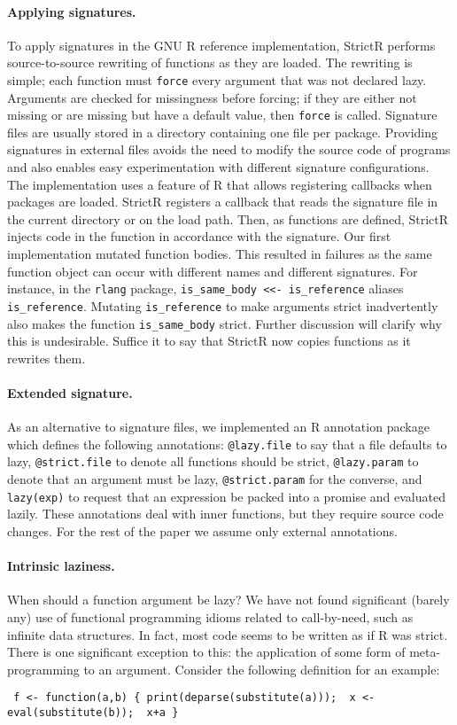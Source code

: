 \documentclass[review,creen,acmsmall]{acmart}
\newcommand{\code}[1]{\lstinline |#1|\xspace}
\renewcommand{\c}[1]{\lstinline |#1|\xspace}
\newcommand{\strictr}{{\sf StrictR}\xspace}
\begin{document}
\paragraph{Applying signatures.}
To apply signatures in the GNU R reference implementation, \strictr performs
source-to-source rewriting of functions as they are loaded. The rewriting is
simple; each function must \c{force} every argument that was not declared lazy.
Arguments are checked for missingness before forcing; if they are either not
missing or are missing but have a default value, then \c{force} is called.
Signature files are usually stored in a directory containing one file per
package. Providing signatures in external files avoids the need to modify the
source code of programs and also enables easy experimentation with different
signature configurations. The implementation uses a feature of R that allows
registering callbacks when packages are loaded. \strictr registers a callback
that reads the signature file in the current directory or on the load path.
Then, as functions are defined, \strictr injects code in the function in
accordance with the signature. Our first implementation mutated function bodies.
This resulted in failures as the same function object can occur with different
names and different signatures. For instance, in the \code{rlang} package,
\code{is_same_body <<- is_reference} aliases \code{is_reference}. Mutating
\code{is_reference} to make arguments strict inadvertently also makes the
function \code{is_same_body} strict. Further discussion will clarify why this is
undesirable. Suffice it to say that \strictr now copies functions as it rewrites
them.

\paragraph{Extended signature.}
As an alternative to signature files, we implemented an R annotation package
which defines the following annotations: \c{@lazy.file} to say that a
file defaults to lazy, \c{@strict.file} to denote all functions should be
strict, \c{@lazy.param} to denote that an argument must be lazy,
\c{@strict.param} for the converse, and \c{lazy(exp)} to request that an
expression be packed into a promise and evaluated lazily. These annotations deal
with inner functions, but they require source code changes. For the rest of the
paper we assume only external annotations.

\paragraph{Intrinsic laziness.} When should a function argument be lazy?
We have not found significant (barely any) use of functional programming idioms
related to call-by-need, such as infinite data structures. In fact, most code
seems to be written as if R was strict. There is one significant exception to
this: the application of some form of meta-programming to an argument.
Consider the following definition for an example:
\begin{lstlisting}
 f <- function(a,b) { print(deparse(substitute(a)));  x <- eval(substitute(b));  x+a }
\end{lstlisting}
\end{document}
